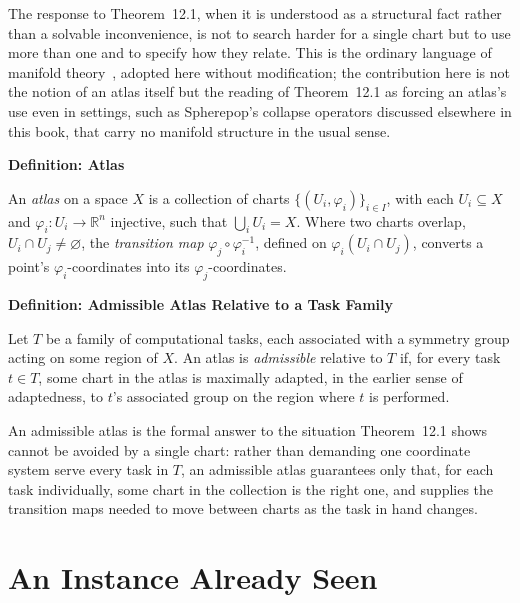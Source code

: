 \documentclass[11pt,fleqn]{book}
\numberwithin{equation}{chapter}
\newenvironment{definition}[1]
  {\begin{definitionEnv}
   \noindent\textbf{Definition: #1}\par\smallskip}
  {\end{definitionEnv}}
\theoremstyle{plain}
\theoremstyle{definition}
\theoremstyle{remark}
\newcommand{\R}{\mathbb{R}}
\begin{document}
The response to Theorem~12.1, when it is understood as a structural fact rather than a solvable inconvenience, is not to search harder for a single chart but to use more than one and to specify how they relate. This is the ordinary language of manifold theory~\cite{lee2012}, adopted here without modification; the contribution here is not the notion of an atlas itself but the reading of Theorem~12.1 as forcing an atlas's use even in settings, such as Spherepop's collapse operators discussed elsewhere in this book, that carry no manifold structure in the usual sense.

\begin{definition}{Atlas}
An \emph{atlas} on a space \(X\) is a collection of charts \(\{(U_i,\varphi_i)\}_{i\in I}\), with each \(U_i\subseteq X\) and \(\varphi_i:U_i\to\R^n\) injective, such that \(\bigcup_i U_i = X\). Where two charts overlap, \(U_i\cap U_j\neq\varnothing\), the \emph{transition map} \(\varphi_j\circ\varphi_i^{-1}\), defined on \(\varphi_i(U_i\cap U_j)\), converts a point's \(\varphi_i\)-coordinates into its \(\varphi_j\)-coordinates.
\end{definition}

\begin{definition}{Admissible Atlas Relative to a Task Family}
Let \(T\) be a family of computational tasks, each associated with a symmetry group acting on some region of \(X\). An atlas is \emph{admissible} relative to \(T\) if, for every task \(t\in T\), some chart in the atlas is maximally adapted, in the earlier sense of adaptedness, to \(t\)'s associated group on the region where \(t\) is performed.
\end{definition}

An admissible atlas is the formal answer to the situation Theorem~12.1 shows cannot be avoided by a single chart: rather than demanding one coordinate system serve every task in \(T\), an admissible atlas guarantees only that, for each task individually, some chart in the collection is the right one, and supplies the transition maps needed to move between charts as the task in hand changes.

\section{An Instance Already Seen}
\end{document}
